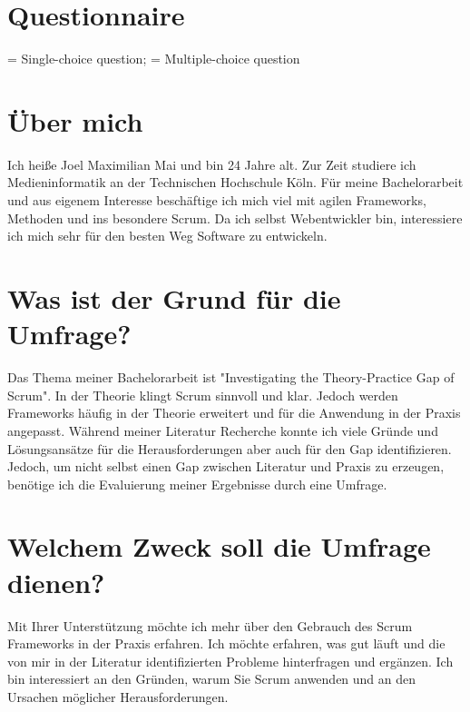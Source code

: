 \newpage
\section{Questionnaire}\label{app:Questionnaire}
\einzelantworticon = Single-choice question; \checkboxantworticon = Multiple-choice question

\section*{Über mich}
Ich heiße Joel Maximilian Mai und bin 24 Jahre alt. Zur Zeit studiere ich Medieninformatik an der Technischen Hochschule Köln. Für meine Bachelorarbeit und aus eigenem Interesse beschäftige ich mich viel mit agilen Frameworks, Methoden und ins besondere Scrum. Da ich selbst Webentwickler bin, interessiere ich mich sehr für den besten Weg Software zu entwickeln. 

\section*{Was ist der Grund für die Umfrage?}
Das Thema meiner Bachelorarbeit ist "Investigating the Theory-Practice Gap of Scrum". In der Theorie klingt Scrum sinnvoll und klar. Jedoch werden Frameworks häufig in der Theorie erweitert und für die Anwendung in der Praxis angepasst. Während meiner Literatur Recherche konnte ich viele Gründe und Lösungsansätze für die Herausforderungen aber auch für den Gap identifizieren. Jedoch, um nicht selbst einen Gap zwischen Literatur und Praxis zu erzeugen, benötige ich die Evaluierung meiner Ergebnisse durch eine Umfrage.

\section*{Welchem Zweck soll die Umfrage dienen?}
Mit Ihrer Unterstützung möchte ich mehr über den Gebrauch des Scrum Frameworks in der Praxis erfahren. Ich möchte erfahren, was gut läuft und die von mir in der Literatur identifizierten Probleme hinterfragen und ergänzen. Ich bin interessiert an den Gründen, warum Sie Scrum anwenden und an den Ursachen möglicher Herausforderungen. 

